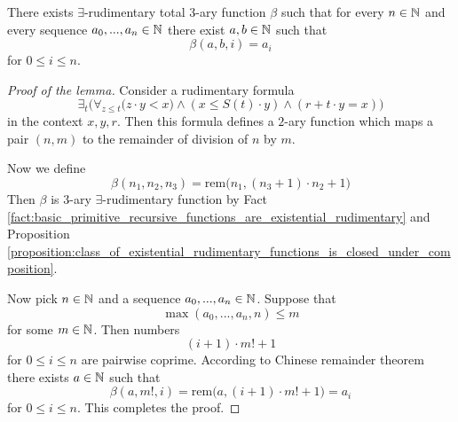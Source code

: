\documentclass[10pt]{amsart}
\begin{document}
\begin{lemma}\label{lemma:Godels_beta_lemma}
	There exists $\exists$-rudimentary total $3$-ary function $\beta$ such that for every $n \in {\mathbb N}$ and every sequence $a_0,...,a_n \in {\mathbb N}$ there exist $a, b \in {\mathbb N}$ such that
	$$\beta(a,b,i) = a_i$$
	for $0 \leq i \leq n$.
\end{lemma}
\begin{proof}[Proof of the lemma]
	Consider a rudimentary formula
	$$\exists_t\bigg(\forall_{z \leq t}\big(z\cdot y < x\big)\wedge \left(x \leq S(t)\cdot y\right) \wedge \left(r + t\cdot y = x\right)\bigg)$$
	in the context $x, y, r$. Then this formula defines a $2$-ary function which maps a pair $(n, m)$ to the remainder of division of $n$ by $m$.

	Now we define
	$$\beta\left(n_1,n_2,n_3\right) = \mathrm{rem}\big(n_1,\left(n_3 + 1\right)\cdot n_2 + 1\big)$$
	Then $\beta$ is $3$-ary $\exists$-rudimentary function by Fact \ref{fact:basic_primitive_recursive_functions_are_existential_rudimentary} and Proposition \ref{proposition:class_of_existential_rudimentary_functions_is_closed_under_composition}.

	Now pick $n \in {\mathbb N}$ and a sequence $a_0,...,a_n \in {\mathbb N}$. Suppose that
	$$\max\left(a_0,...,a_n, n\right) \leq m$$
	for some $m \in {\mathbb N}$. Then numbers
	$$\left(i + 1\right)\cdot m! + 1$$
	for $0 \leq i \leq n$ are pairwise coprime. According to Chinese remainder theorem there exists $a \in {\mathbb N}$ such that
	$$\beta(a, m!, i) = \mathrm{rem}\big(a, \left(i + 1\right)\cdot m! + 1\big) = a_i$$
	for $0\leq i \leq n$. This completes the proof.
\end{proof}
\end{document}
